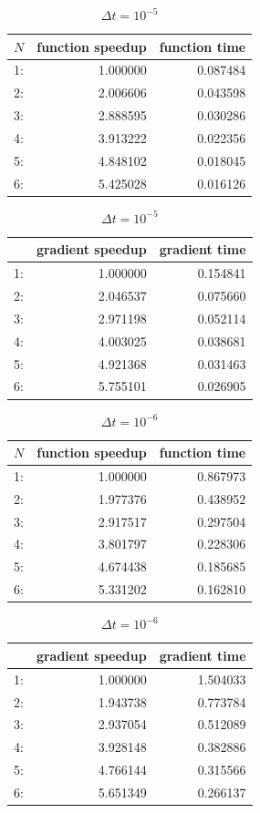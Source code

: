 \begin{table}[!h]
\centering
\caption{$\Delta t=10^{-5}$}
\begin{tabular}{lrr}
\toprule
{}$N$ &  function speedup &    function  time \\
\midrule
1: &  1.000000 &  0.087484 \\
2: &  2.006606 &  0.043598 \\
3: &  2.888595 &  0.030286 \\
4: &  3.913222 &  0.022356 \\
5: &  4.848102 &  0.018045 \\
6: &  5.425028 &  0.016126 \\
\bottomrule
\end{tabular}
\begin{tabular}{lrr}
\toprule
{} &  gradient speedup &     gradient time \\
\midrule
1: &  1.000000 &  0.154841 \\
2: &  2.046537 &  0.075660 \\
3: &  2.971198 &  0.052114 \\
4: &  4.003025 &  0.038681 \\
5: &  4.921368 &  0.031463 \\
6: &  5.755101 &  0.026905 \\
\bottomrule
\end{tabular}
\end{table}
\begin{table}[!h]
\centering
\caption{$\Delta t=10^{-6}$}
\begin{tabular}{lrr}
\toprule
{} $N$&  function speedup &    function time \\
\midrule
1: &  1.000000 &  0.867973 \\
2: &  1.977376 &  0.438952 \\
3: &  2.917517 &  0.297504 \\
4: &  3.801797 &  0.228306 \\
5: &  4.674438 &  0.185685 \\
6: &  5.331202 &  0.162810 \\
\bottomrule
\end{tabular}
\begin{tabular}{lrr}
\toprule
{} &  gradient speedup &    gradient time \\
\midrule
1: &  1.000000 &  1.504033 \\
2: &  1.943738 &  0.773784 \\
3: &  2.937054 &  0.512089 \\
4: &  3.928148 &  0.382886 \\
5: &  4.766144 &  0.315566 \\
6: &  5.651349 &  0.266137 \\
\bottomrule
\end{tabular}
\end{table}
